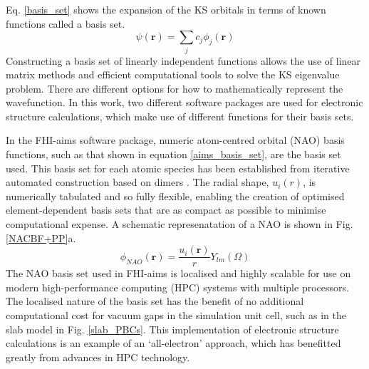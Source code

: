 \documentclass[11pt, twoside]{report}
\begin{document}
Eq. \ref{basis_set} shows the expansion of the KS orbitals in terms of known functions called a basis set. 
\begin{equation}\label{basis_set}
\psi(\mathbf{r}) = \sum_j c_j \phi_j(\mathbf{r})
\end{equation}
Constructing a basis set of linearly independent functions allows the use of linear matrix methods and efficient computational tools to solve the KS eigenvalue problem. There are different options for how to mathematically represent the wavefunction. In this work, two different software packages are used for electronic structure calculations, which make use of different functions for their basis sets. 


In the FHI-aims software package, numeric atom-centred orbital (NAO) basis functions, such as that shown in equation \ref{aims_basis_set}, are the basis set used. This basis set for each atomic species has been established from iterative automated construction based on dimers \cite{FHI-aims_slides}. The radial shape, $u_i(r)$, is numerically tabulated and so fully flexible, enabling the creation of optimised element-dependent basis sets that are as compact as possible to minimise computational expense. A schematic represenatation of a NAO is shown in Fig. \ref{NACBF+PP}a.
\begin{equation}\label{aims_basis_set}
\phi_{NAO}(\mathbf{r}) = \frac{u_i(\mathbf{r})}{r} Y_{lm}(\Omega)
\end{equation}
The NAO basis set used in FHI-aims is localised and highly scalable for use on modern high-performance computing (HPC) systems with multiple processors. The localised nature of the basis set has the benefit of no additional computational cost for vacuum gaps in the simulation unit cell, such as in the slab model in Fig. \ref{slab_PBCs}. This implementation of electronic structure calculations is an example of an `all-electron' approach, which has benefitted greatly from advances in HPC technology. 
\end{document}

